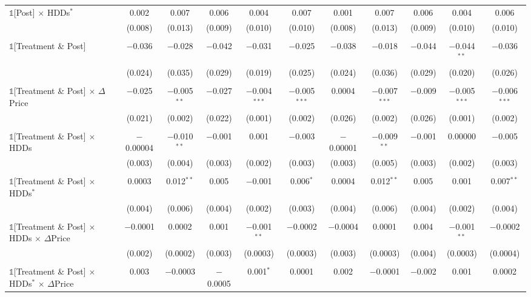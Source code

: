 \begin{table}[!htbp]
\begin{longtable}{@{\extracolsep{0pt}}lcccccccccc}
 $\mathbb{1}$[Post] $\times$ HDDs$^{*}$ & 0.002 & 0.007 & 0.006 & 0.004 & 0.007 & 0.001 & 0.007 & 0.006 & 0.004 & 0.006 \\ 
  & (0.008) & (0.013) & (0.009) & (0.010) & (0.010) & (0.008) & (0.013) & (0.009) & (0.010) & (0.010) \\ 
  & & & & & & & & & & \\ 
 $\mathbb{1}$[Treatment \& Post] & $-$0.036 & $-$0.028 & $-$0.042 & $-$0.031 & $-$0.025 & $-$0.038 & $-$0.018 & $-$0.044 & $-$0.044$^{**}$ & $-$0.036 \\ 
  & (0.024) & (0.035) & (0.029) & (0.019) & (0.025) & (0.024) & (0.036) & (0.029) & (0.020) & (0.026) \\ 
  & & & & & & & & & & \\ 
 $\mathbb{1}$[Treatment \& Post] $\times$ $\Delta$Price & $-$0.025 & $-$0.005$^{**}$ & $-$0.027 & $-$0.004$^{***}$ & $-$0.005$^{***}$ & 0.0004 & $-$0.007$^{***}$ & $-$0.009 & $-$0.005$^{***}$ & $-$0.006$^{***}$ \\ 
  & (0.021) & (0.002) & (0.022) & (0.001) & (0.002) & (0.026) & (0.002) & (0.026) & (0.001) & (0.002) \\ 
  & & & & & & & & & & \\ 
 $\mathbb{1}$[Treatment \& Post] $\times$ HDDs & $-$0.00004 & $-$0.010$^{**}$ & $-$0.001 & 0.001 & $-$0.003 & $-$0.00001 & $-$0.009$^{**}$ & $-$0.001 & 0.00000 & $-$0.005 \\ 
  & (0.003) & (0.004) & (0.003) & (0.002) & (0.003) & (0.003) & (0.005) & (0.003) & (0.002) & (0.003) \\ 
  & & & & & & & & & & \\ 
 $\mathbb{1}$[Treatment \& Post] $\times$ HDDs$^{*}$ & 0.0003 & 0.012$^{**}$ & 0.005 & $-$0.001 & 0.006$^{*}$ & 0.0004 & 0.012$^{**}$ & 0.005 & 0.001 & 0.007$^{**}$ \\ 
  & (0.004) & (0.006) & (0.004) & (0.002) & (0.003) & (0.004) & (0.006) & (0.004) & (0.002) & (0.004) \\ 
  & & & & & & & & & & \\ 
 $\mathbb{1}$[Treatment \& Post] $\times$ HDDs $\times$ $\Delta$Price & $-$0.0001 & 0.0002 & 0.001 & $-$0.001$^{**}$ & $-$0.0002 & $-$0.0004 & 0.0001 & 0.004 & $-$0.001$^{**}$ & $-$0.0002 \\ 
  & (0.002) & (0.0002) & (0.003) & (0.0003) & (0.0003) & (0.003) & (0.0003) & (0.004) & (0.0003) & (0.0004) \\ 
  & & & & & & & & & & \\ 
 $\mathbb{1}$[Treatment \& Post] $\times$ HDDs$^{*}$ $\times$ $\Delta$Price & 0.003 & $-$0.0003 & $-$0.0005 & 0.001$^{*}$ & 0.0001 & 0.002 & $-$0.0001 & $-$0.002 & 0.001 & 0.0002 \\ 

\end{longtable}
\end{table}
